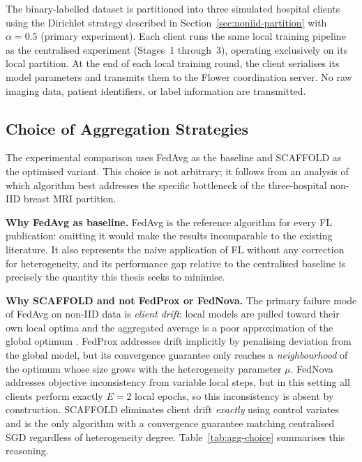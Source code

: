 The binary-labelled dataset is partitioned into three
simulated hospital clients using the Dirichlet strategy
described in Section~\ref{sec:noniid-partition} with
$\alpha = 0.5$ (primary experiment).
Each client runs the same local training pipeline as the
centralised experiment (Stages~1 through~3), operating
exclusively on its local partition.
At the end of each local training round, the client
serialises its model parameters and transmits them to the
Flower coordination server.
No raw imaging data, patient identifiers, or label
information are transmitted.


\subsection{Choice of Aggregation Strategies}
\label{sec:agg-choice}

The experimental comparison uses FedAvg as the
baseline and SCAFFOLD as the optimised variant.
This choice is not arbitrary; it follows from an
analysis of which algorithm best addresses the
specific bottleneck of the three-hospital
non-IID breast MRI partition.

\textbf{Why FedAvg as baseline.}
FedAvg \cite{mcmahan2017fedavg} is the reference
algorithm for every FL publication: omitting it would
make the results incomparable to the existing
literature.
It also represents the naive application of FL without
any correction for heterogeneity, and its performance
gap relative to the centralised baseline is precisely
the quantity this thesis seeks to minimise.

\textbf{Why SCAFFOLD and not FedProx or FedNova.}
The primary failure mode of FedAvg on non-IID data is
\emph{client drift}: local models are pulled toward
their own local optima and the aggregated average is a
poor approximation of the global optimum
\cite{karimireddy2020scaffold}.
FedProx \cite{li2020fedprox} addresses drift
implicitly by penalising deviation from the global
model, but its convergence guarantee only reaches a
\emph{neighbourhood} of the optimum whose size grows
with the heterogeneity parameter $\mu$.
FedNova \cite{li2020fednova} addresses objective
inconsistency from variable local steps, but in this
setting all clients perform exactly $E=2$ local epochs,
so this inconsistency is absent by construction.
SCAFFOLD \cite{karimireddy2020scaffold} eliminates
client drift \emph{exactly} using control variates and
is the only algorithm with a convergence guarantee
matching centralised SGD regardless of heterogeneity
degree.
Table~\ref{tab:agg-choice} summarises this reasoning.

